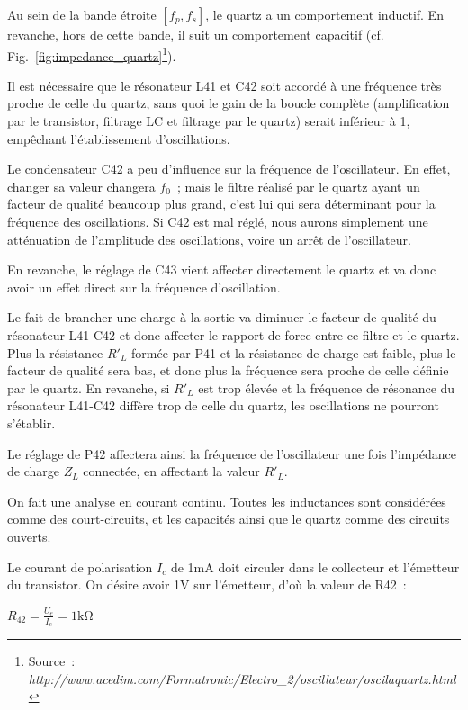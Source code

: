\documentclass{article}
\begin{document}
Au sein de la bande étroite $[f_p,f_s]$, le quartz a un comportement inductif. En revanche, hors de cette bande, il suit un comportement capacitif (cf. Fig.~\ref{fig:impedance_quartz}\footnote{Source~: \textit{http://www.acedim.com/Formatronic/Electro\_2/oscillateur/oscilaquartz.html}}).

Il est nécessaire que le résonateur L41 et C42 soit accordé à une fréquence très proche de celle du quartz, sans quoi le gain de la boucle complète (amplification par le transistor, filtrage LC et filtrage par le quartz) serait inférieur à 1, empêchant l'établissement d'oscillations.


Le condensateur C42 a peu d'influence sur la fréquence de l'oscillateur. En effet, changer sa valeur changera $f_0$~; mais le filtre réalisé par le quartz ayant un facteur de qualité beaucoup plus grand, c'est lui qui sera déterminant pour la fréquence des oscillations. Si C42 est mal réglé, nous aurons simplement une atténuation de l'amplitude des oscillations, voire un arrêt de l'oscillateur.

En revanche, le réglage de C43 vient affecter directement le quartz et va donc avoir un effet direct sur la fréquence d'oscillation.


Le fait de brancher une charge à la sortie va diminuer le facteur de qualité du résonateur L41-C42 et donc affecter le rapport de force entre ce filtre et le quartz. Plus la résistance $R'_L$ formée par P41 et la résistance de charge est faible, plus le facteur de qualité sera bas, et donc plus la fréquence sera proche de celle définie par le quartz. En revanche, si $R'_L$ est trop élevée et la fréquence de résonance du résonateur L41-C42 diffère trop de celle du quartz, les oscillations ne pourront s'établir.

Le réglage de P42 affectera ainsi la fréquence de l'oscillateur une fois l'impédance de charge $Z_L$ connectée, en affectant la valeur $R'_L$.


On fait une analyse en courant continu. Toutes les inductances sont considérées comme des court-circuits, et les capacités ainsi que le quartz comme des circuits ouverts.

Le courant de polarisation $I_c$ de 1mA doit circuler dans le collecteur et l'émetteur du transistor. On désire avoir 1V sur l'émetteur, d'où la valeur de R42~:
\begin{center}
$R_{42} = \frac{U_e}{I_c} = 1\mathrm{k\Omega}$
\end{center}
\end{document}
